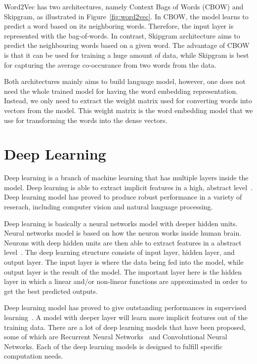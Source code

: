 Word2Vec has two architectures, namely Context Bags of Words (CBOW) and Skipgram, as illustrated in Figure~\ref{fig:word2vec}. In CBOW, the model learns to predict a word based on its neighboring words. Therefore, the input layer is represented with the bag-of-words. In contrast, Skipgram architecture aims to predict the neighbouring words based on a given word. The advantage of CBOW is that it can be used for training a huge amount of data, while Skipgram is best for capturing the average co-occurance from two words from the data.

Both architectures mainly aims to build language model, however, one does not need the whole trained model for having the word embedding representation. Instead, we only need to extract the weight matrix used for converting words into vectors from the model. This weight matrix is the word embedding model that we use for transforming the words into the dense vectors.

\section{Deep Learning}
Deep learning is a branch of machine learning that has multiple layers inside the model. Deep learning is able to extract implicit features in a high, abstract level~\citep{lecun2015deep}. Deep learning model has proved to produce robust performance in a variety of reserach, including computer vision and natural language processing.

Deep learning is basically a neural networks model with deeper hidden units. Neural networks model is based on how the neuron works inside human brain. Neurons with deep hidden units are then able to extract features in a abstract level~\citep{bengio2007scaling}. The deep learning structure consists of input layer, hidden layer, and output layer. The input layer is where the data being fed into the model, while output layer is the result of the model. The important layer here is the hidden layer in which a linear and/or non-linear functions are approximated in order to get the best predicted outputs.

Deep learning model has proved to give outstanding performances in supervised learning~\citep{Goodfellow-et-al-2016-Book}. A model with deeper layer will learn more implicit features out of the training data. There are a lot of deep learning models that have been proposed, some of which are Recurrent Neural Networks~\citep{elman1990finding} and Convolutional Neural Networks. Each of the deep learning models is designed to fulfill specific computation needs.

